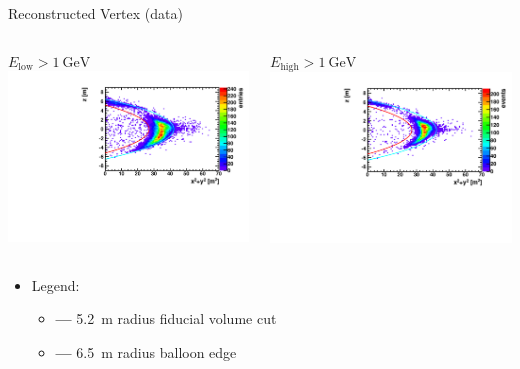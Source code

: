 \documentclass[14pt]{beamer}
\begin{document}
\begin{frame}{Reconstructed Vertex (data)}
	\begin{columns}[t]
		\begin{block}{\centering$E_{\text{low}} >
			\SI{1}{\giga\electronvolt}$}
			\centering
			\includegraphics[width=\linewidth]{kat_vertex_min1gev_lowEnergyRecon.pdf}
		\end{block}
		\begin{block}{\centering$E_{\text{high}} >
			\SI{1}{\giga\electronvolt}$}
			\centering
			\includegraphics[width=\linewidth]{kat_vertex_min1gev_highEnergyRecon.pdf}
		\end{block}
	\end{columns}
	\begin{itemize}
		\item[] Legend:
			\begin{itemize}
				\item[] {\color{red}\textbf{---}} \SI{5.2}{\meter} radius
					fiducial volume cut
				\item[] {\color{cyan}\textbf{---}} \SI{6.5}{\meter} radius
					balloon edge
			\end{itemize}
	\end{itemize}
\end{frame}
\end{document}
